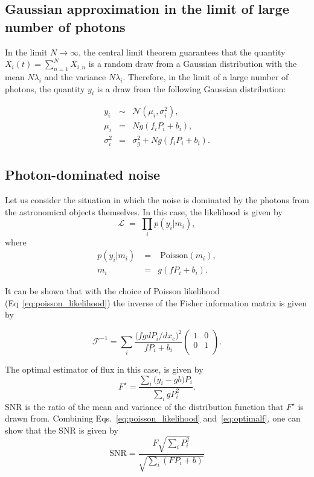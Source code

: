 \documentclass[onecolumn]{aastex61}
\newcommand{\beq}{\begin{equation}}
\newcommand{\eeq}{\end{equation}}
\begin{document}
\subsection{Gaussian approximation in the limit of large number of photons}

In the limit $N \rightarrow \infty$, the central limit theorem guarantees that the quantity $X_{i}(t) = \sum_{n=1}^{N} X_{i,n}$ is a random draw 
from a Gaussian distribution with the mean $N\lambda_i$ and the variance $N\lambda_i$. Therefore, in the limit of a large number of photons, the quantity $y_{i}$ 
is a draw from the following Gaussian distribution:

\begin{eqnarray}
y_{i} &\sim& \mathcal{N}(\mu_i , \sigma_i^2), \\
\mu_i &=& N g (f_iP_i + b_i), \\
\sigma_i^{2} &=& \sigma_{g}^{2} + N g (f_iP_i + b_i).
\end{eqnarray}


\subsection{Photon-dominated noise}

Let us consider the situation in which the noise is dominated by the photons from the astronomical objects themselves. In this case, the likelihood is given by
\beq
\mathcal{L} \; = \; \prod_{i} p(y_{i}|m_i),
\label{eq:poisson_likelihood}
\eeq
where 
\begin{eqnarray}
p(y_i|m_i) \; &=& \; \mathrm{Poisson}(m_i),\\
m_i &=& g(fP_i+b_i).
\end{eqnarray}

It can be shown that with the choice of Poisson likelihood (Eq~\ref{eq:poisson_likelihood}) the inverse of the Fisher information matrix is given by 

\beq
  \mathcal{F}^{-1} = \sum_i \frac{\Big(fgdP_{i}/dx_c\Big)^{2}}{fP_i + b_i} 
  \begin{pmatrix}
      1 & 0\\
      0 & 1\\
  \end{pmatrix}.
\label{crlbmoffat}
\eeq

The optimal estimator of flux in this case, is given by
\beq
F^{\star} = \frac{\sum_i \Big(y_i - gb\Big)P_i}{\sum_i gP_i^2}.
\label{eq:optimalf}
\eeq
SNR is the ratio of the mean and variance of the distribution function that $F^{\star}$ is drawn from. Combining Eqs.~\ref{eq:poisson_likelihood} and~\ref{eq:optimalf}, one can show that the SNR is given by 
\beq
\text{SNR} = \frac{F\sqrt{\sum_i P_i^2}}{\sqrt{\sum_i(FP_i+b)}}
\eeq
\end{document}
